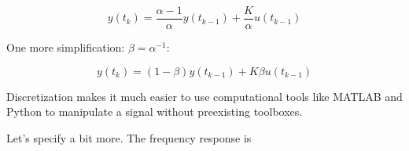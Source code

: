\documentclass{report}
\begin{document}
\begin{onehalfspacing}
\begin{flushleft}
\[y(t_k) = \frac{\alpha - 1}{\alpha} y(t_{k-1}) + \frac{K}{\alpha} u(t_{k-1})\]

One more simplification: \(\beta = \alpha^{-1}\):

\[y(t_k) = (1-\beta) y(t_{k-1}) + K \beta u(t_{k-1})\]

Discretization makes it much easier to use computational tools like MATLAB and Python to manipulate a signal without preexisting toolboxes.

\medskip

Let's specify a bit more. The frequency response is 

\end{flushleft}
\end{onehalfspacing}
\end{document}

